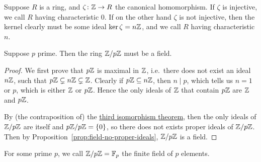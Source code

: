 \begin{definition}
    Suppose \(R\) is a ring,
    and \(\zeta\colon\mathbb{Z}\to R\) the canonical homomorphism.
    If \(\zeta\) is injective, %
    we call \(R\) having characteristic 0.
    If on the other hand \(\zeta\) is not injective,
    then the kernel clearly must be some ideal \(\ker\zeta = n\mathbb{Z}\),
    and we call \(R\) having characteristic \(n\).
\end{definition}
\begin{proposition}
    Suppose \(p\) prime.
    Then the ring \(\mathbb{Z}/p\mathbb{Z}\) must be a field.
\end{proposition}
\begin{proof}
    We first prove that \(p\mathbb{Z}\) is maximal in \(\mathbb{Z}\),
    i.e.\ there does not exist an ideal \(n\mathbb{Z}\),
    such that \(p\mathbb{Z} \subsetneq n\mathbb{Z} \subsetneq \mathbb{Z}\).
    Clearly if \(p\mathbb{Z} \subseteq n\mathbb{Z}\),
    then \(n \mid p\), which tells us \(n = 1\) or \(p\),
    which is either \(\mathbb{Z}\) or \(p\mathbb{Z}\).
    Hence the only ideals of \(\mathbb{Z}\) that contain \(p\mathbb{Z}\)
    are \(\mathbb{Z}\) and \(p\mathbb{Z}\).

    By (the contraposition of)
    the \hyperref[thm:iso-3-ring]{third isomorphism theorem},
    then the only ideals of \(\mathbb{Z}/p\mathbb{Z}\) are itself and \(p\mathbb{Z}/p\mathbb{Z} = \{0\}\),
    so there does not exists proper ideals of \(\mathbb{Z}/p\mathbb{Z}\).
    Then by Proposition~\ref{prop:field-no-proper-ideals},
    \(\mathbb{Z}/p\mathbb{Z}\) is a field.
\end{proof}
\begin{definition}
    For some prime \(p\),
    we call \(\mathbb{Z}/p\mathbb{Z} = \mathbb{F}_p\)
    the finite field of \(p\) elements.
\end{definition}

